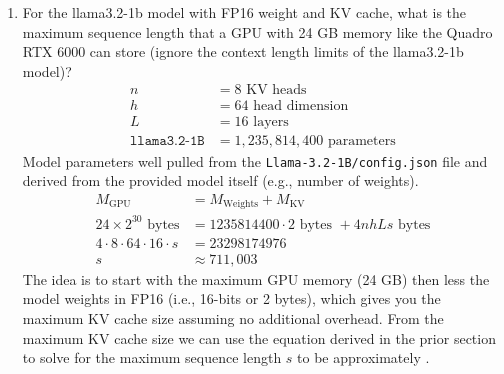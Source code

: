 \documentclass[12pt]{article}
\begin{document}
\begin{enumerate}[label=\textbf{Q\arabic*.}]
\begin{enumerate}
        \item For the llama3.2-1b model with FP16 weight and KV cache, what is the maximum sequence length that a GPU with 24 GB memory like the Quadro RTX 6000 can store (ignore the context length limits of the llama3.2-1b model)?
        \begin{align*}
            n &= 8 \text{ KV heads}\\
            h &= 64 \text{ head dimension}\\
            L &= 16 \text{ layers}\\
            \texttt{llama3.2-1B} &= 1,235,814,400 \text{ parameters}
        \end{align*}
        Model parameters well pulled from the \texttt{Llama-3.2-1B/config.json} file and derived from the provided model itself (e.g., number of weights).
        \begin{align*}
            M_\text{GPU} &= M_\text{Weights} + M_\text{KV} \\
            24 \times 2^{30} \text{ bytes} &= 1235814400 \cdot 2 \text{ bytes } + 4nhLs \text{ bytes}\\
            4 \cdot 8 \cdot 64 \cdot 16 \cdot s &= 23298174976 \\
            s &\approx \boxed{711,003}
        \end{align*}
        The idea is to start with the maximum GPU memory (24 GB) then less the model weights in FP16 (i.e., 16-bits or 2 bytes), which gives you the maximum KV cache size assuming no additional overhead. From the maximum KV cache size we can use the equation derived in the prior section to solve for the maximum sequence length $s$ to be approximately .

    \end{enumerate}
\end{enumerate}
\end{document}
